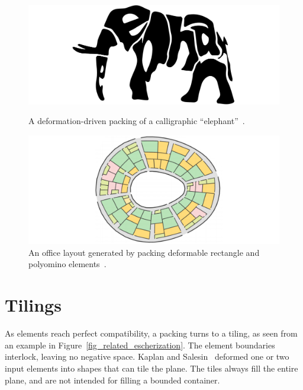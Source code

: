 \begin{figure}
\centering
\includegraphics[width=1.0\textwidth]{figures/related/calligraphy.pdf} 
\caption[A calligraphy packing of an ``elephant'']
{\label{fig_calligraphy_packing} 
\newtext
{
A deformation-driven packing of a calligraphic ``elephant''~\cite{Xu2007}.
}
}
\includegraphics[width=1.0\textwidth]{figures/related/layout.pdf} 
\caption[An office layout generated by packing \newline deformable rectangle and polyomino elements]
{\label{fig_office}
\nnewtext
{
An office layout generated by packing deformable rectangle and polyomino elements~\cite{Peng2014}.
}
}
\end{figure}




\section{Tilings}
\label{related_wrok_tiling}

\newtext
{
As elements reach perfect compatibility, a packing turns to a tiling, as seen from an example in Figure~\ref{fig_related_escherization}.
The element boundaries interlock, leaving no negative space.
Kaplan and Salesin~\cite{Kaplan2000, Kaplan2004} deformed one or two 
input elements into shapes that can tile the plane.
The tiles always fill the entire plane, and are not intended for filling a bounded container.}


